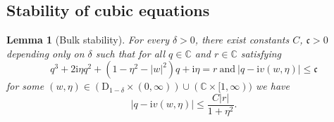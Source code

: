 \documentclass[10pt,a4paper]{amsart}
\newcommand{\ii}{\mathrm{i}}
\newcommand{\C}{\mathbb{C}}
\newtheorem{lemma}{Lemma}[section]
\numberwithin{equation}{section}
\begin{document}
	\subsection{Stability of cubic equations} \label{app:cubic_stability} 
	
	\begin{lemma}[Bulk stability]\label{lem:bulkstab}
		For every $\delta >0$, there exist constants 
		$C$, $\mathfrak{c} >0$ depending only on $\delta$ such that for all $q \in \C$ and $r \in \C$ satisfying 
		\begin{equation}\label{eq:q_r_equation} 
			q^3 + 2\ii\eta q^2 + \left(1-\eta^2 - |w|^2 \right) q +\ii \eta =r~\text{and}~ \left|q - \ii v(w,\eta) \right| \le \mathfrak{c}
		\end{equation}
		for some $(w,\eta) \in (\mathrm{D}_{1-\delta} \times (0,\infty))\cup (\C \times [1,\infty))$ we have 
		\begin{equation*}
			\left|q - \ii v(w,\eta) \right| \le \frac{C|r|}{1 + \eta^2}.
		\end{equation*}
	\end{lemma}
	
\end{document}
